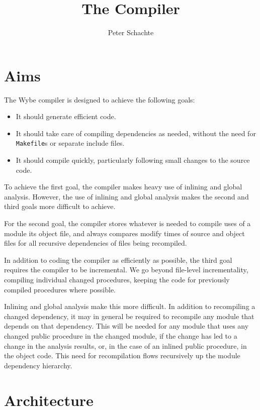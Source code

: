 \documentclass{article}
\title{The \Lang Compiler}
\author{Peter Schachte}
\newcommand{\lang}{\textsf{Wybe}\xspace}
\begin{document}
\maketitle

\section{Aims}

The \lang compiler is designed to achieve the following goals:
\begin{itemize}
\item It should generate efficient code.
\item It should take care of compiling dependencies as needed, without
  the need for \texttt{Makefile}s or separate include files.  
\item It should compile quickly, particularly following small changes to the 
  source code.
\end{itemize}

To achieve the first goal, the compiler makes heavy use of inlining and
global analysis.
However, the use of inlining and global analysis makes the second and
third goals more difficult to achieve.

For the second goal, the compiler stores whatever is needed to compile uses
of a module its object file, and always compares modify times of source and
object files for all recursive dependencies of files being recompiled.

In addition to coding the compiler as efficiently as possible,
the third goal requires the compiler to be incremental.
We go beyond file-level incrementality, compiling individual changed
procedures, keeping the code for previously compiled procedures where possible.

Inlining and global analysis make this more difficult.
In addition to recompiling a changed dependency,
it may in general be required to recompile any
module that depends on that dependency.
This will be needed for any module that uses any changed public procedure
in the changed module, if the change has led to a change in the analysis
results, or, in the case of an inlined public procedure, in the object code.
This need for recompilation flows recursively up the module dependency
hierarchy.


\section{Architecture}
\label{sec:arch}
\end{document}
